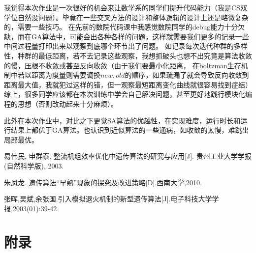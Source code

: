 \documentclass[12pt]{article}
\begin{document}
我觉得本次作业是一次很好的机会来让数学系的同学们提升代码能力（我是CS双学位自然没问题）。毕竟在一些交叉方法的设计和整体逻辑的设计上还是略微复杂的，需要一些技巧。
在先前的数院代码课中我感觉数院同学的debug能力十分欠缺，而在GA算法中，可能会出各种各样的问题，这样就需要我们更多的记录一些中间过程量打印出来以观察到底哪个环节出了问题。
如记录每次迭代种群的多样性，种群的最低距离，若不去记录这些观察，我想抓破头也想不出究竟是算法收敛的慢，压根不收敛或甚至反向收敛（由于我们要最小化距离，
在boltzman生存机制中若以距离为度量则需要调换$new,old$的顺序，如果疏漏了就会导致反向收敛到距离最大值，我就犯过这样的错，但一观察最短距离变化曲线就很容易找到症结）
综上，很多同学应该都在本次训练中学会自己解决问题，甚至更好地践行模块化编程的思想（否则改动起来十分麻烦）。

此外在本次作业中，对比之下更觉SA算法的优越性，在实现难度，运行时长和运行结果上都优于GA算法。也认识到近似算法的一些通病，如收敛的太慢，难跳出局部最优。


\begin{thebibliography}{9}
  易伟民, 申群泰. 整流机组效率优化中遗传算法的研究与应用[J]. 贵州工业大学学报(自然科学版), 2003.  

  朱凤龙. 遗传算法“早熟”现象的探究及改进策略[D].西南大学,2010.

  张晖,吴斌,余张国.引入模拟退火机制的新型遗传算法[J].电子科技大学学报,2003(01):39-42.
\end{thebibliography}

% 
% 
\newpage
\section*{附录}
\end{document}
